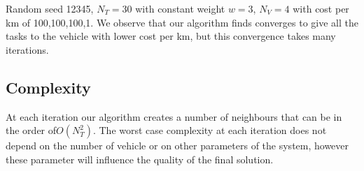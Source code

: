 \documentclass[11pt]{article}
\begin{document}
Random seed 12345, $N_T=30$ with constant weight $w=3$, $N_V=4$ with cost per km of {100,100,100,1}. We observe that our algorithm finds converges to give all the tasks to the vehicle with lower cost per km, but this convergence takes many iterations.

\subsection{Complexity}
At each iteration our algorithm creates a number of neighbours that can be in the order of$O(N_T^2)$. The worst case complexity at each iteration does not depend on the number of vehicle or on other parameters of the system, however these parameter will influence the quality of the final solution.
\end{document}
